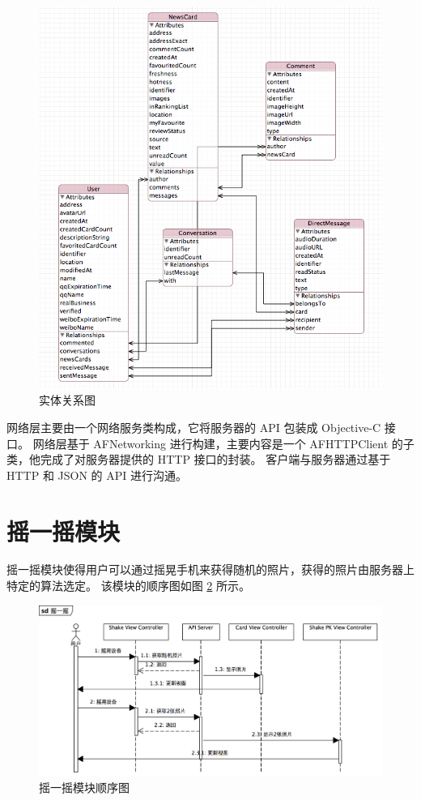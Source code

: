 \begin{figure}[h!]
    \centering
    \includegraphics[width=400pt]{figure/entity_relationship_diagram.png}
    \caption{实体关系图}
    \label{entity-relationship-diagram}
\end{figure}

网络层主要由一个网络服务类构成，它将服务器的 API 包装成 Objective-C 接口。
网络层基于 AFNetworking 进行构建，主要内容是一个 AFHTTPClient 的子类，他完成了对服务器提供的 HTTP 接口的封装。
客户端与服务器通过基于 HTTP 和 JSON 的 API 进行沟通。

\section{摇一摇模块}

摇一摇模块使得用户可以通过摇晃手机来获得随机的照片，获得的照片由服务器上特定的算法选定。
该模块的顺序图如图 \ref{shake-device-sequence-diagram} 所示。

\begin{figure}[h!]
    \centering
    \includegraphics[width=400pt]{figure/shake_device_sequence_diagram.png}
    \caption{摇一摇模块顺序图}
    \label{shake-device-sequence-diagram}
\end{figure}

